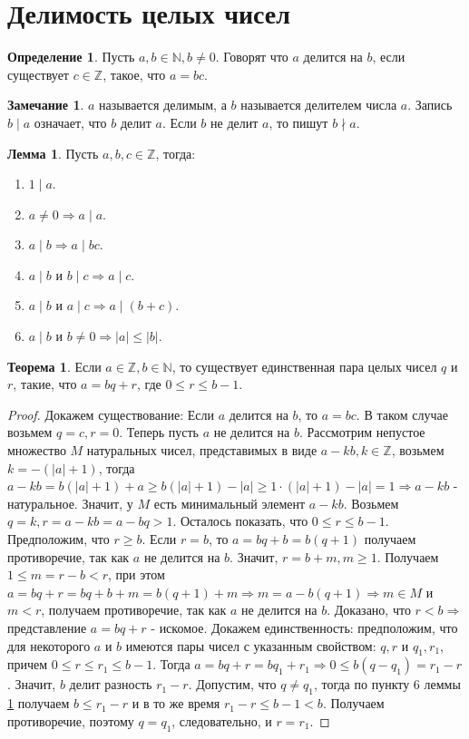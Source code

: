 \documentclass[a4paper, 12pt]{article}
\newcommand{\N}{\mathbb{N}}
\newcommand{\Z}{\mathbb{Z}}
\newcommand{\ndiv}{\nmid}
\theoremstyle{definition}
\newtheorem{definition}{Определение}[section]
\newtheorem{theorem}{Теорема}[section]
\newtheorem{lemma}{Лемма}[section]
\newtheorem*{comm}{Замечание}
\begin{document}
    \section{Делимость целых чисел}
    \begin{definition}
        Пусть $a,b\in \mathbb{N}, b\ne 0$. Говорят что $a$ делится на $b$, если существует $c\in \mathbb{Z}$, такое, что $a=bc$.
    \end{definition}
    \begin{comm}
        $a$ называется делимым, а $b$ называется делителем числа $a$. Запись $b \mid a$ означает, что $b$ делит $a$. Если $b$ не делит $a$, то пишут $b\ndiv a$.
    \end{comm}
    \begin{lemma} \label{lemma1.1}
        Пусть $a,b,c \in \mathbb{Z}$, тогда:
        \begin{enumerate}
            \item $1 \mid a$.
            \item $a\ne 0 \Rightarrow a\mid a$.
            \item $a\mid b \Rightarrow a\mid bc$.
            \item $a\mid b$ и $b\mid c \Rightarrow a\mid c$.
            \item $a\mid b$ и $a\mid c \Rightarrow a\mid (b+c)$.
            \item $a\mid b$ и $b\ne 0 \Rightarrow |a|\leq|b|$.
        \end{enumerate}
    \end{lemma}
    \begin{theorem} \label{th1.1}
        Если $a\in \Z, b\in \N$, то существует единственная пара целых чисел $q$ и $r$, такие, что $a=bq+r$, где $0\leq r\leq b-1$. 
    \end{theorem}
    \begin{proof}
        Докажем существование: Если $a$ делится на $b$, то $a=bc$. В таком случае возьмем $q=c, r=0$. Теперь пусть $a$ не делится на $b$. Рассмотрим непустое множество $M$ натуральных чисел, представимых в виде $a-kb, k\in \mathbb{Z}$, возьмем $k=-(|a|+1)$, тогда $a-kb=b(|a|+1)+a\geq b(|a|+1)-|a|\geq 1\cdot (|a|+1)-|a|=1 \Rightarrow a-kb$ - натуральное. Значит, у $M$ есть минимальный элемент $a-kb$. Возьмем $q=k, r=a-kb=a-bq > 1$. Осталось показать, что $0\leq r\leq b-1$. Предположим, что $r\geq b$. Если $r=b$, то $a=bq+b=b(q+1)$ получаем противоречие, так как $a$ не делится на $b$. Значит, $r=b+m, m\geq 1$. Получаем $1\leq m=r-b<r$, при этом $a=bq+r=bq+b+m=b(q+1)+m \Rightarrow m=a-b(q+1) \Rightarrow m\in M$ и $m<r$, получаем противоречие, так как $a$ не делится на $b$. Доказано, что $r<b \Rightarrow$ представление $a=bq+r$ - искомое. Докажем единственность: предположим, что для некоторого $a$ и $b$ имеются пары чисел с указанным свойством: $q,r$ и $q_1,r_1$, причем $0\leq r\leq r_1 \leq b-1$. Тогда $a=bq+r=bq_1+r_1\Rightarrow 0\leq b(q-q_1)=r_1-r$. Значит, $b$ делит разность $r_1-r$. Допустим, что $q\ne q_1$, тогда по пункту 6 леммы \ref{lemma1.1} получаем $b\leq r_1-r$ и в то же время $r_1-r\leq b-1<b$. Получаем противоречие, поэтому $q=q_1$, следовательно, и $r=r_1$.
    \end{proof}
\end{document}
